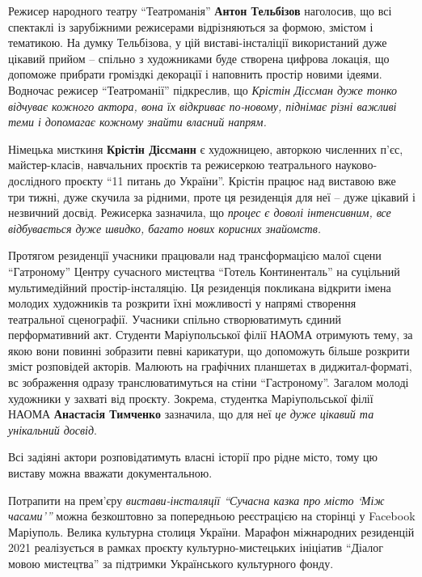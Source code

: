 Режисер народного театру \enquote{Театроманія} \textbf{Антон Тельбізов} наголосив, що всі
спектаклі із зарубіжними режисерами відрізняються за формою, змістом і
тематикою. На думку Тельбізова, у цій виставі-інсталіції використаний дуже
цікавий прийом – спільно з художниками буде створена цифрова локація, що
допоможе прибрати громіздкі декорації і наповнить простір новими ідеями.
Водночас режисер \enquote{Театроманії} підкреслив, що \emph{Крістін Діссман дуже тонко
відчуває кожного актора, вона їх відкриває по-новому, піднімає різні важливі
теми і допомагає кожному знайти власний напрям.}


Німецька мисткиня \textbf{Крістін Діссманн} є художницею, авторкою численних п'єс,
майстер-класів, навчальних проєктів та режисеркою театрального
науково-дослідного проєкту \enquote{11 питань до України}. Крістін працює над виставою
вже три тижні, дуже скучила за рідними, проте ця резиденція для неї – дуже
цікавий і незвичний досвід. Режисерка зазначила, що \emph{процес є доволі
інтенсивним, все відбувається дуже швидко, багато нових корисних знайомств.}

Протягом резиденції учасники працювали над трансформацією малої сцени
\enquote{Гатроному} Центру сучасного мистецтва \enquote{Готель Континенталь} на
суцільний мультимедійний простір-інсталяцію. Ця резиденція покликана відкрити
імена молодих художників та розкрити їхні можливості у напрямі створення
театральної сценографії. Учасники спільно створюватимуть єдиний перформативний
акт.  Студенти Маріупольської філії НАОМА отримують тему, за якою вони повинні
зобразити певні карикатури, що допоможуть більше розкрити зміст розповідей
акторів. Малюють на графічних планшетах в диджитал-форматі, вс зображення
одразу транслюватимуться на стіни \enquote{Гастроному}. Загалом молоді
художники у захваті від проєкту. Зокрема, студентка Маріупольської філії НАОМА
\textbf{Анастасія Тимченко} зазначила, що для неї \emph{це дуже цікавий та унікальний досвід}.

Всі задіяні актори розповідатимуть власні історії про рідне місто, тому цю
виставу можна вважати документальною.

Потрапити на прем'єру \emph{вистави-інсталяції \enquote{Сучасна казка про місто
\enquote{Між часами}}} можна безкоштовно за попередньою реєстрацією на сторінці
у Facebook Маріуполь.  Велика культурна столиця України. Марафон міжнародних
резиденцій 2021 реалізується в рамках проєкту культурно-мистецьких ініціатив
\enquote{Діалог мовою мистецтва} за підтримки Українського культурного фонду.
